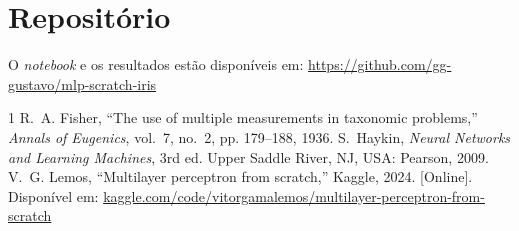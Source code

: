 \documentclass[conference]{IEEEtran}
\begin{document}
\section*{Repositório}

O \emph{notebook} e os resultados estão disponíveis em: \href{https://github.com/gg-gustavo/mlp-scratch-iris}{https://github.com/gg-gustavo/mlp-scratch-iris}

\begin{thebibliography}{1}
 R.~A. Fisher, ``The use of multiple measurements in taxonomic problems,'' \emph{Annals of Eugenics}, vol.~7, no.~2, pp. 179--188, 1936.
 S.~Haykin, \emph{Neural Networks and Learning Machines}, 3rd ed. Upper Saddle River, NJ, USA: Pearson, 2009.
 V.~G. Lemos, ``Multilayer perceptron from scratch,'' Kaggle, 2024. [Online]. Disponível em: \href{https://www.kaggle.com/code/vitorgamalemos/multilayer-perceptron-from-scratch}{kaggle.com/code/vitorgamalemos/multilayer-perceptron-from-scratch}
\end{thebibliography}
\end{document}
